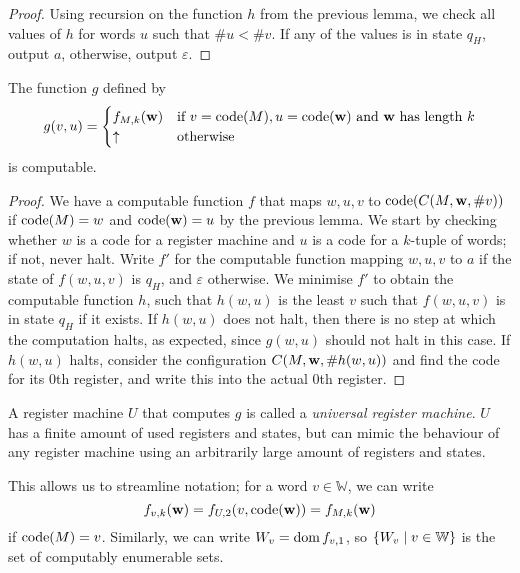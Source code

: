 \begin{proof}
	Using recursion on the function \( h \) from the previous lemma, we check all values of \( h \) for words \( u \) such that \( \# u < \# v \).
	If any of the values is in state \( q_H \), output \( a \), otherwise, output \( \varepsilon \).
\end{proof}
\begin{theorem}
	The function \( g \) defined by
	\[ g(v,u) = \begin{cases}
		f_{M,k}(\vb w) & \text{if } v = \operatorname{code}(M), u = \operatorname{code}(\vb w) \text{ and \( \vb w \) has length \( k \)} \\
		\uparrow & \text{otherwise}
	\end{cases} \]
	is computable.
\end{theorem}
\begin{proof}
	We have a computable function \( f \) that maps \( w, u, v \) to \( \operatorname{code}(C(M,\vb w, \# v)) \) if \( \operatorname{code}(M) = w \) and \( \operatorname{code}(\vb w) = u \) by the previous lemma.
	We start by checking whether \( w \) is a code for a register machine and \( u \) is a code for a \( k \)-tuple of words; if not, never halt.
	Write \( f' \) for the computable function mapping \( w, u, v \) to \( a \) if the state of \( f(w,u,v) \) is \( q_H \), and \( \varepsilon \) otherwise.
	We minimise \( f' \) to obtain the computable function \( h \), such that \( h(w,u) \) is the least \( v \) such that \( f(w,u,v) \) is in state \( q_H \) if it exists.
	If \( h(w,u) \) does not halt, then there is no step at which the computation halts, as expected, since \( g(w,u) \) should not halt in this case.
	If \( h(w,u) \) halts, consider the configuration \( C(M,\vb w, \#h(w,u)) \) and find the code for its 0th register, and write this into the actual 0th register.
\end{proof}
\begin{remark}
	A register machine \( U \) that computes \( g \) is called a \emph{universal register machine}.
	\( U \) has a finite amount of used registers and states, but can mimic the behaviour of any register machine using an arbitrarily large amount of registers and states.

	This allows us to streamline notation; for a word \( v \in \mathbb W \), we can write
	\[ f_{v,k}(\vb w) = f_{U,2}(v,\operatorname{code}(\vb w)) = f_{M,k}(\vb w) \]
	if \( \operatorname{code}(M) = v \).
	Similarly, we can write \( W_v = \operatorname{dom} f_{v,1} \), so \( \qty{W_v \mid v \in \mathbb W} \) is the set of computably enumerable sets.
\end{remark}
